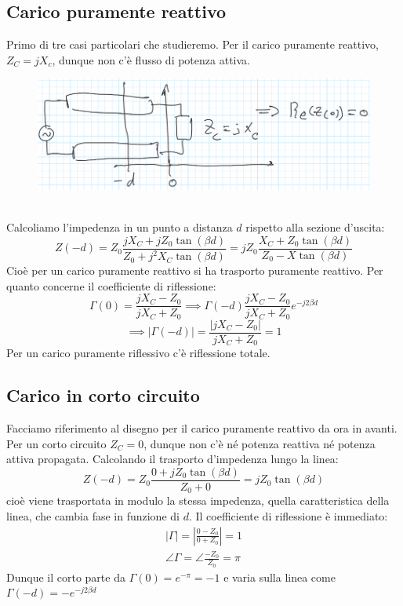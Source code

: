 \documentclass{book}
\begin{document}
    \subsection*{Carico puramente reattivo}
        Primo di tre casi particolari che studieremo. Per il carico puramente reattivo, $Z_{C}=jX_{c}$, dunque 
        non c'è flusso di potenza attiva.
        \begin{figure}[h!]
            \center  
            \includegraphics[width=0.5\linewidth]{Chapter_two/Chapt2img10.png}
        \end{figure} \\
        Calcoliamo l'impedenza in un punto a distanza $d$ rispetto alla sezione d'uscita:
        \begin{equation}
            Z(-d) = Z_{0} \frac{jX_{C}+jZ_{0}\tan(\beta d)}{Z_{0}+j^{2}X_{C}\tan(\beta d)} = jZ_{0} \frac{X_{C}+Z_{0}\tan(\beta d)}{Z_{0}-X\tan(\beta d)}
        \end{equation}
        Cioè per un carico puramente reattivo si ha trasporto puramente reattivo. Per quanto concerne il coefficiente 
        di riflessione:
        \begin{equation}
            \Gamma (0) = \frac{jX_{C}-Z_{0}}{jX_{C}+Z_{0}} \implies \Gamma(-d) \frac{jX_{C}-Z_{0}}{jX_{C}+Z_{0}}e^{-j2\beta d}
        \end{equation}
        \begin{equation}
            \implies |\Gamma (-d)| = \frac{|jX_{C}-Z_{0}|}{jX_{C}+Z_{0}} = 1
        \end{equation}
        Per un carico puramente riflessivo c'è riflessione totale.
    \subsection*{Carico in corto circuito}
        Facciamo riferimento al disegno per il carico puramente reattivo da ora in avanti.
        Per un corto circuito $Z_{C}=0$, dunque non c'è né potenza reattiva né potenza attiva propagata.
        Calcolando il trasporto d'impedenza lungo la linea:
        \begin{equation}
            Z(-d ) = Z_{0}\frac{0 +jZ_{0}\tan(\beta d)}{Z_{0}+0} = jZ_{0}\tan(\beta d)
        \end{equation}
        cioè viene trasportata in modulo la stessa impedenza, quella caratteristica della linea, che cambia fase 
        in funzione di $d$. Il coefficiente di riflessione è immediato:
        \begin{align}
            |\Gamma|=|\frac{0-Z_{0}}{0+Z_{0}}|=1 \\
            \angle \Gamma = \angle \frac{-Z_{0}}{Z_{0}} = \pi
        \end{align}
        Dunque il corto parte da $\Gamma(0)=e^{-\pi} = -1$ e varia sulla linea come $\Gamma(-d) = -e^{-j2\beta d}$
\end{document}
